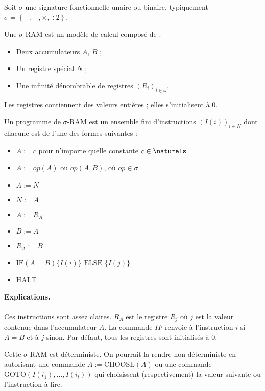 \documentclass{report}
\newcommand{\sRAMif}[2]{\text{IF} (A=B) \{I( #1 )\} \text{ ELSE } \{I( #2 )\}}
\begin{document}
		
		Soit $\sigma$ une signature fonctionnelle unaire ou binaire, typiquement $\sigma = \left\lbrace +, -, \times, \div 2\right\rbrace$. 
		
		
		\begin{definition} 
			\label{def:sigma_RAM}
			
			Une $\sigma$-RAM est un modèle de calcul composé de :

			\begin{itemize}[itemsep=-1mm]
				\item	Deux accumulateurs $A$, $B$ ;
				\item 	Un registre spécial $N$ ;
				\item 	Une infinité dénombrable de registres $\left( R_i\right)_{i \in \omega}$.
			\end{itemize}
			
			Les registres contiennent des valeurs entières ; elles s'initialisent à 0. 
			
			Un programme de $\sigma$-RAM est un ensemble fini d'instructions $\left( I(i) \right)_{i \in N}$ dont chacune est de l'une des formes suivantes :
			
			\begin{itemize}[itemsep=-1mm]
				\item 	$A := c$ pour n'importe quelle constante $c \in \naturels$
				\item 	$A := op(A)$ ou $op(A,B)$, où $op \in \sigma$
				\item 	$A := N$ 
				\item 	$N := A$
				\item 	$A := R_A$
				\item 	$B := A$ 
				\item 	$R_A := B$
				\item 	$\sRAMif{i}{j}$
				\item 	$\text{HALT}$
			\end{itemize}	
			
			
			\paragraph{Explications.} 
			Ces instructions sont assez claires. $R_A$ est le registre $R_j$ où $j$ est la valeur contenue dans l'accumulateur $A$. La commande $IF$ renvoie à l'instruction $i$ si $A = B$ et à $j$ sinon.
			Par défaut, tous les registres sont initialisés à $0$.
			
			Cette $\sigma$-RAM est déterministe. On pourrait la rendre non-déterministe en autorisant une commande $A := \text{CHOOSE}(A)$ ou une commande $\text{GOTO}\left( I(i_1), \dots, I(i_t)\right)$ qui choisissent (respectivement) la valeur suivante ou l'instruction à lire.
		\end{definition}
		
\end{document}
